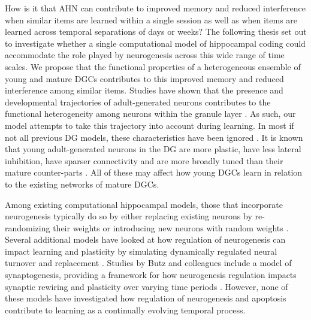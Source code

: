 How is it that \ac{AHN} can contribute to improved memory and reduced interference
when similar items are learned within a single session as well as when items
are learned across temporal separations of days or weeks?  
The following thesis set out to investigate whether a single computational model of hippocampal
coding could accommodate the role played by neurogenesis across this wide range
of time scales. 
We propose that the functional properties of a heterogeneous ensemble 
of young and mature \acp{DGC} contributes to this improved memory 
and reduced interference among similar items. 
Studies have shown that the presence and 
developmental trajectories of adult-generated neurons contributes 
to the functional heterogeneity among neurons 
within the granule layer \citep{wang-et-al-00, mcavoy-et-al-15}.
As such, our model attempts to take this trajectory into 
account during learning.
In most if not all previous \ac{DG} models, these characteristics have been ignored 
\citep{replacement_neurogenesis, chambers-potenza-hoffman-miranker-04,
additive_neurogenesis, weisz-argibay-2012}. 
It is known that young
adult-generated neurons in the \ac{DG} 
are more plastic, have less lateral inhibition, have sparser connectivity and are
more broadly tuned than their mature counter-parts
\citep{enhanced_synaptic_plasticity,snyder-et-al-01,temprana-et-al-2015,determinants_of_sparse_activation,neurogenesis_dictating_the_tone,
marin-burgin-et-al-12}.
All of these may affect
how young \acp{DGC} learn in relation to the existing
networks of mature
\acp{DGC}.

Among existing computational hippocampal models, those that incorporate 
neurogenesis typically do so by
either replacing existing neurons by re-randomizing their weights 
\citep{replacement_neurogenesis,chambers-potenza-hoffman-miranker-04} 
or introducing new neurons with random weights \citep{additive_neurogenesis,weisz-argibay-2012}.
Several additional models have looked at how regulation of neurogenesis can impact learning and plasticity 
by simulating dynamically regulated neural turnover and replacement 
\citep{deisseroth-singla-toda-monje-palmer-malenka-04,apoptosis-neurogenesis-hebbian-networks,chambers-conroy-07}.
Studies by Butz and colleagues include a model of synaptogenesis, providing a framework for 
how neurogenesis regulation impacts synaptic rewiring and plasticity over varying time periods 
\citep{lehmann-et-al-05,butz-et-al-06,butz-et-al-08}.
However, none of these models have investigated how 
regulation of neurogenesis and apoptosis
contribute to learning as a continually evolving temporal process. 

